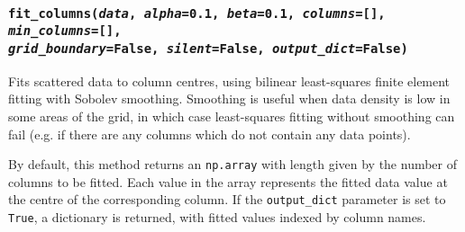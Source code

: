 \begin{snugshade}\subsubsection{\texttt{fit\_columns(\emph{data}, \emph{alpha}=0.1, \emph{beta}=0.1, \emph{columns}=[], \emph{min\_columns}=[], \\
    \emph{grid\_boundary}=False, \emph{silent}=False, \emph{output\_dict}=False)}}\end{snugshade}
\label{sec:mulgrid:fit_columns}

Fits scattered data to column centres, using bilinear least-squares finite element fitting with Sobolev smoothing.  Smoothing is useful when data density is low in some areas of the grid, in which case least-squares fitting without smoothing can fail (e.g. if there are any columns which do not contain any data points).

By default, this method returns an \texttt{np.array} with length given by the number of columns to be fitted. Each value in the array represents the fitted data value at the centre of the corresponding column. If the \texttt{output\_dict} parameter is set to \texttt{True}, a dictionary is returned, with fitted values indexed by column names.

